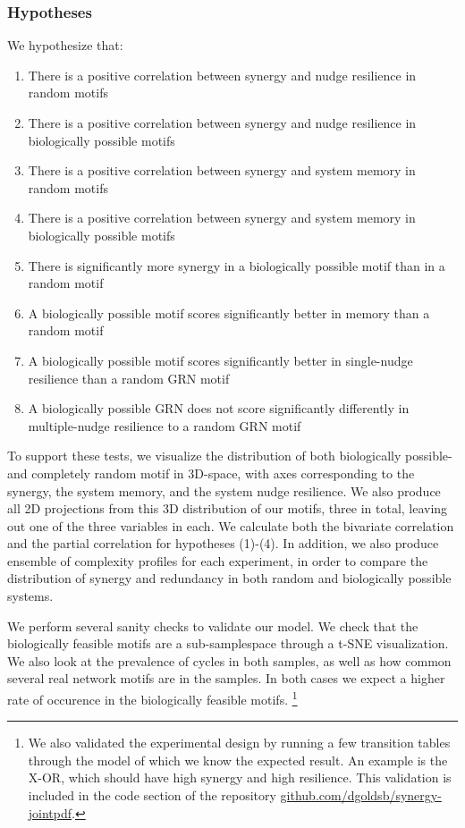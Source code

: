\documentclass[../main.tex]{subfiles}
\begin{document}
\subsubsection{Hypotheses}

We hypothesize that:

\begin{enumerate}
\itemsep0em 
\item There is a positive correlation between synergy and nudge resilience in random motifs
\item There is a positive correlation between synergy and nudge resilience in biologically possible motifs
\item There is a positive correlation between synergy and system memory in random motifs
\item There is a positive correlation between synergy and system memory in biologically possible motifs
\item There is significantly more synergy in a biologically possible motif than in a random motif
\item A biologically possible motif scores significantly better in memory than a random motif
\item A biologically possible motif scores significantly better in single-nudge resilience than a random GRN motif
\item A biologically possible GRN does not score significantly differently in multiple-nudge resilience to a random GRN motif
\end{enumerate}

To support these tests, we visualize the distribution of both biologically possible- and completely random motif in 3D-space, with axes corresponding to the synergy, the system memory, and the system nudge resilience.
We also produce all 2D projections from this 3D distribution of our motifs, three in total, leaving out one of the three variables in each.
We calculate both the bivariate correlation and the partial correlation for hypotheses (1)-(4).
In addition, we also produce ensemble of complexity profiles for each experiment, in order to compare the distribution of synergy and redundancy in both random and biologically possible systems.

We perform several sanity checks to validate our model.
We check that the biologically feasible motifs are a sub-samplespace through a t-SNE visualization.
We also look at the prevalence of cycles in both samples, as well as how common several real network motifs are in the samples.
In both cases we expect a higher rate of occurence in the biologically feasible motifs.
\footnote{We also validated the experimental design by running a few transition tables through the model of which we know the expected result. An example is the X-OR, which should have high synergy and high resilience. This validation is included in the code section of the repository \url{github.com/dgoldsb/synergy-jointpdf}.}
\end{document}
